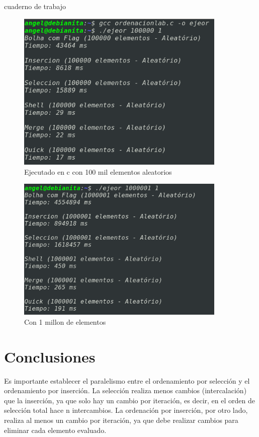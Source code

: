 \documentclass[a4paper]{article}
\begin{document}
cuaderno de trabajo
\cite{colab}


\begin{figure}[H]%

\centering
\includegraphics[width=10cm]{imagenes/t100milc.png}
\caption{Ejecutado en c con 100 mil elementos aleatorios}

\end{figure}

\begin{figure}[H]%

\centering
\includegraphics[width=10cm]{imagenes/millon.png}
\caption{Con 1 millon de elementos}

\end{figure}
\section{Conclusiones}


Es importante establecer el paralelismo entre el ordenamiento por selección y el ordenamiento por inserción. La selección realiza menos cambios (intercalación) que la inserción, ya que solo hay un cambio por iteración, es decir, en el orden de selección total hace n
intercambios. La ordenación por inserción, por otro lado, realiza al menos un cambio por iteración, ya que debe realizar cambios para eliminar cada elemento evaluado.
\end{document}
